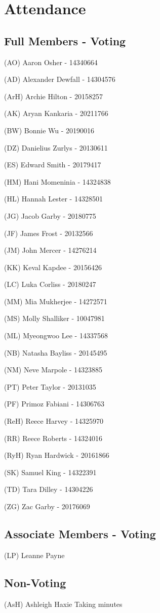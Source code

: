 \documentclass[11pt]{meetingmins}
\begin{document}
\vspace{1em}

\pagebreak

\section{Attendance}
\subsection{Full Members - Voting}
\begin{items}
	\item
	(AO) Aaron Osher - 14340664
	\item
	(AD) Alexander Dewfall - 14304576
	\item
	(ArH) Archie Hilton - 20158257
	\item
	(AK) Aryan Kankaria - 20211766
	\item
	(BW) Bonnie Wu - 20190016
	\item
	(DZ) Danielius Zurlys - 20130611
	\item
	(ES) Edward Smith - 20179417
	\item
	(HM) Hani Momeninia - 14324838
	\item
	(HL) Hannah Lester - 14328501
	\item
	(JG) Jacob Garby  - 20180775
	\item
	(JF) James Frost - 20132566
	\item
	(JM) John Mercer - 14276214
	\item
	(KK) Keval Kapdee - 20156426
	\item
	(LC) Luka Corliss - 20180247
	\item
	(MM) Mia Mukherjee - 14272571
	\item
	(MS) Molly Shalliker - 10047981
	\item
	(ML) Myeongwoo Lee - 14337568
	\item
	(NB) Natasha Bayliss - 20145495
	\item
	(NM) Neve Marpole - 14323885
	\item
	(PT) Peter Taylor - 20131035
	\item
	(PF) Primoz Fabiani - 14306763
	\item
	(ReH) Reece Harvey - 14325970
	\item
	(RR) Reece Roberts - 14324016
	\item
	(RyH) Ryan Hardwick - 20161866
	\item
	(SK) Samuel King - 14322391
	\item
	(TD) Tara Dilley - 14304226
	\item
	(ZG) Zac Garby - 20176069	
\end{items}

\subsection{Associate Members - Voting}
\begin{items}
	\item
	(LP) Leanne Payne	
\end{items}

\subsection{Non-Voting}
\begin{items}
	\item
	(AsH) Ashleigh Haxie	
		\subitem
		Taking minutes
\end{items}
\end{document}
